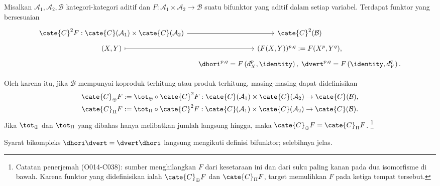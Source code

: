 \begin{definisiproposisi}\label{def:bifunctor-cplx}
	Misalkan $\mathcal{A}_1,\mathcal{A}_2,\mathcal{B}$ kategori-kategori
	aditif dan $F:\mathcal{A}_1\times\mathcal{A}_2\to\mathcal{B}$ suatu
	bifunktor yang aditif dalam setiap variabel. Terdapat funktor yang
	bersesuaian
	\[\begin{tikzcd}[row sep=tiny, column sep=small]
		\cate{C}^2 F: \cate{C}(\mathcal{A}_1) \times \cate{C}(\mathcal{A}_2) \arrow[r] & \cate{C}^2(\mathcal{B}) \\
		(X, Y) \arrow[mapsto, r] & (F(X, Y))^{p, q} := F(X^p, Y^q), \\
		& \dhori^{p, q} = F\left( d_X^p, \identity \right), \; \dvert^{p, q} = F\left( \identity, d_Y^q\right) .
	\end{tikzcd}\]

	Oleh karena itu, jika $\mathcal{B}$ mempunyai koproduk terhitung atau
	produk terhitung, masing-masing dapat didefinisikan
	\begin{gather*}
		\cate{C}_{\oplus} F := \tot_{\oplus} \circ \cate{C}^2 F: \cate{C}(\mathcal{A}_1) \times \cate{C}(\mathcal{A}_2) \to \cate{C}(\mathcal{B}), \\
		\cate{C}_{\Pi} F := \tot_{\Pi} \circ \cate{C}^2 F: \cate{C}(\mathcal{A}_1) \times \cate{C}(\mathcal{A}_2) \to \cate{C}(\mathcal{B}).
	\end{gather*}
	Jika $\tot_{\oplus}$ dan $\tot_{\Pi}$ yang dibahas hanya melibatkan
	jumlah langsung hingga, maka $\cate{C}_{\oplus}F=\cate{C}_{\Pi}F$.%
	\footnote{Catatan penerjemah (O014-C038): sumber menghilangkan $F$ dari
	kesetaraan ini dan dari suku paling kanan pada dua isomorfisme di bawah.
	Karena funktor yang didefinisikan ialah $\cate{C}_{\oplus}F$ dan
	$\cate{C}_{\Pi}F$, target memulihkan $F$ pada ketiga tempat tersebut.}
\end{definisiproposisi}
\begin{bukti}
	Syarat bikompleks $\dhori\dvert=\dvert\dhori$ langsung mengikuti definisi
	bifunktor; selebihnya jelas.
\end{bukti}

